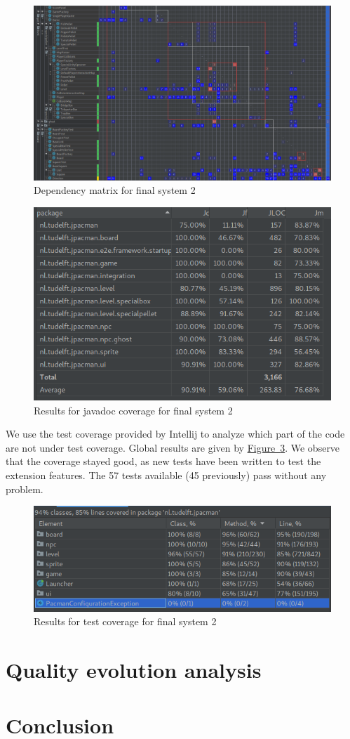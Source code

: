 \documentclass[]{article}
\newcommand{\wordlink}[2]{\hyperref[#2]{#1~\ref{#2}}}
\begin{document}
\newpage

\vspace{0.2cm}

\begin{figure}[h]
\centering
\includegraphics[width=0.95\linewidth]{S1-depmatrix_final}
\caption{Dependency matrix for final system 2}
\label{fig:S1_depmatrix_final}
\end{figure}

\vspace{0.3cm}

\begin{figure}[h]
\centering
\includegraphics[width=0.52\linewidth]{S1-doc_final}
\caption{Results for javadoc coverage for final system 2}
\label{fig:S1_javadoc_final}
\end{figure}

\newpage

We use the test coverage provided by Intellij to analyze which part of the code are not under test coverage. Global results are given by \wordlink{Figure}{fig:S1_testcover_final}. We observe that the coverage stayed good, as new tests have been written to test the extension features. The 57 tests available (45 previously) pass without any problem.\\

\begin{figure}[h]
\centering
\includegraphics[width=0.8\linewidth]{S1-testcover_final}
\caption{Results for test coverage for final system 2}
\label{fig:S1_testcover_final}
\end{figure}

\section{Quality evolution analysis}
\newpage
\section{Conclusion}
\end{document}
